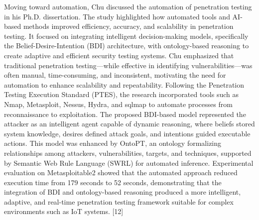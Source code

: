 \documentclass[12pt,a4paper]{report}
\begin{document}
Moving toward automation, Chu discussed the automation of penetration testing in his Ph.D. dissertation. The study highlighted how automated tools and AI-based methods improved efficiency, accuracy, and scalability in penetration testing. It focused on integrating intelligent decision-making models, specifically the Belief-Desire-Intention (BDI) architecture, with ontology-based reasoning to create adaptive and efficient security testing systems. Chu emphasized that traditional penetration testing—while effective in identifying vulnerabilities—was often manual, time-consuming, and inconsistent, motivating the need for automation to enhance scalability and repeatability. Following the Penetration Testing Execution Standard (PTES), the research incorporated tools such as Nmap, Metasploit, Nessus, Hydra, and sqlmap to automate processes from reconnaissance to exploitation. The proposed BDI-based model represented the attacker as an intelligent agent capable of dynamic reasoning, where beliefs stored system knowledge, desires defined attack goals, and intentions guided executable actions. This model was enhanced by OntoPT, an ontology formalizing relationships among attackers, vulnerabilities, targets, and techniques, supported by Semantic Web Rule Language (SWRL) for automated inference. Experimental evaluation on Metasploitable2 showed that the automated approach reduced execution time from 179 seconds to 52 seconds, demonstrating that the integration of BDI and ontology-based reasoning produced a more intelligent, adaptive, and real-time penetration testing framework suitable for complex environments such as IoT systems. [12]
\end{document}
